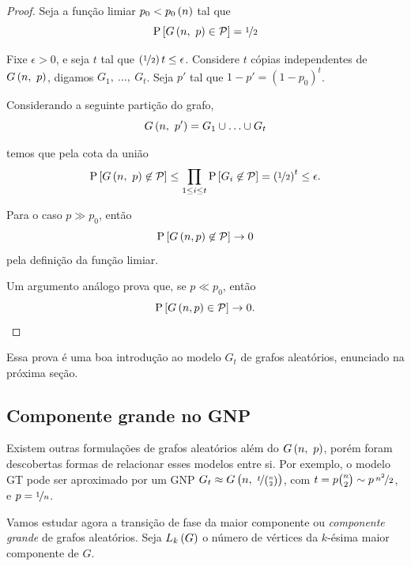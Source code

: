 \begin{proof}
  Seja a função limiar $p_0<p_0\left(n\vphantom{1j}\right)$ tal que
  \[
    \mathrm{P}\left[G\left(n,\ p\vphantom{1j}\right)\in\mathcal{P}\vphantom{1j}\right] = \nicefrac{1}{2}
  \]

  Fixe $\epsilon>0$, e seja $t$ tal que $\left(\nicefrac{1}{2}\vphantom{1j}\right)t\leq\epsilon$. Considere $t$ cópias independentes de $G\left(n,\ p\vphantom{1j}\right)$, digamos $G_1,\ \ldots,\ G_t$. Seja $p'$ tal que $1-p'=(1-p_0)^t$.

  Considerando a seguinte partição do grafo,
  \[
    G\left(n,\ p'\vphantom{1j}\right) = G_1\cup\ldots\cup G_t
  \]

  temos que pela cota da união
  \[
    \mathrm{P}\left[G\left(n,\ p\vphantom{1j}\right)\not\in\mathcal{P}\vphantom{1j}\right]
      \leq \prod_{1\leq i\leq t} \mathrm{P}\left[G_i\not\in\mathcal{P}\vphantom{1j}\right]
      = \left(\nicefrac{1}{2}\vphantom{1j}\right)^t
      \leq \epsilon.
  \]

  Para o caso $p\gg p_0$, então
  \[
    \mathrm{P}\left[G\left(n, p\vphantom{1j}\right)\not\in\mathcal{P}\vphantom{1j}\right] \rightarrow 0
  \]
  pela definição da função limiar.

  Um argumento análogo prova que, se $p\ll p_0$, então
  \[
    \mathrm{P}\left[G\left(n, p\vphantom{1j}\right)\in\mathcal{P}\vphantom{1j}\right] \rightarrow 0.
  \]
\end{proof}

Essa prova é uma boa introdução ao modelo $G_t$ de grafos aleatórios, enunciado na próxima seção.

\subsection{Componente grande no GNP}

Existem outras formulações de grafos aleatórios além do $G\left(n,\ p\vphantom{1j}\right)$, porém foram descobertas formas de relacionar esses modelos entre si. Por exemplo, o modelo GT pode ser aproximado por um GNP $G_t\approx G\left(n,\ \nicefrac{t}{\binom{n}{2}}\vphantom{1j}\right)$, com $t=p\binom{n}{2}\sim p\,\nicefrac{n^2}{2}$, e $p=\nicefrac{1}{n}$.

Vamos estudar agora a transição de fase da maior componente ou \textit{componente grande} de grafos aleatórios. Seja $L_k\left(G\vphantom{1j}\right)$ o número de vértices da $k$-ésima maior componente de $G$.

